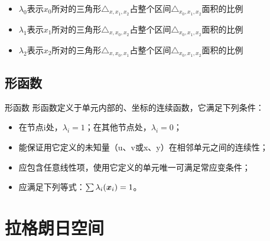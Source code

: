 \begin{itemize}
	\item $\lambda_{0}$表示$x_0$所对的三角形$\triangle_{x,x_1,x_2}$占整个区间$\triangle_{x_0,x_1,x_2}$面积的比例
	\item $\lambda_{1}$表示$x_1$所对的三角形$\triangle_{x,x_0,x_2}$占整个区间$\triangle_{x_0,x_1,x_2}$面积的比例
	\item $\lambda_{2}$表示$x_2$所对的三角形$\triangle_{x,x_0,x_1}$占整个区间$\triangle_{x_0,x_1,x_2}$面积的比例
\end{itemize}


\subsection{形函数}
\begin{definition}{形函数}
	形函数定义于单元内部的、坐标的连续函数，它满足下列条件：
	\begin{itemize}
		\item 在节点i处，$\lambda_i =1$；在其他节点处，$\lambda_i = 0$；
		\item 能保证用它定义的未知量（u、v或x、y）在相邻单元之间的连续性；
		\item 应包含任意线性项，使用它定义的单元唯一可满足常应变条件；
		\item 应满足下列等式：$\sum \lambda_i({\boldsymbol x}_i)= 1$。
	\end{itemize}
\end{definition}


\section{拉格朗日空间}
